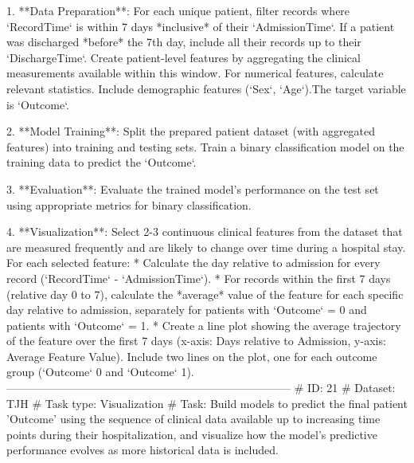 \begin{tcolorbox}[colback=cadmiumgreen!5!white,colframe=forestgreen!75!white,breakable,title=\textit{Generated analytical tasks in task 4.}]
\begin{VerbatimWrap}
 1. **Data Preparation**: For each unique patient, filter records where `RecordTime` is within 7 days *inclusive* of their `AdmissionTime`. If a patient was discharged *before* the 7th day, include all their records up to their `DischargeTime`. Create patient-level features by aggregating the clinical measurements available within this window. For numerical features, calculate relevant statistics. Include demographic features (`Sex`, `Age`).The target variable is `Outcome`.
 
 2. **Model Training**: Split the prepared patient dataset (with aggregated features) into training and testing sets. Train a binary classification model on the training data to predict the `Outcome`.
 
 3. **Evaluation**: Evaluate the trained model's performance on the test set using appropriate metrics for binary classification.
 
 4. **Visualization**: Select 2-3 continuous clinical features from the dataset that are measured frequently and are likely to change over time during a hospital stay. For each selected feature:
  * Calculate the day relative to admission for every record (`RecordTime` - `AdmissionTime`).
  * For records within the first 7 days (relative day 0 to 7), calculate the *average* value of the feature for each specific day relative to admission, separately for patients with `Outcome` = 0 and patients with `Outcome` = 1.
  * Create a line plot showing the average trajectory of the feature over the first 7 days (x-axis: Days relative to Admission, y-axis: Average Feature Value). Include two lines on the plot, one for each outcome group (`Outcome` 0 and `Outcome` 1).
-----------------------------------------------------------------------------
# ID: 21  
# Dataset: TJH 
# Task type: Visualization
# Task: Build models to predict the final patient 'Outcome' using the sequence of clinical data available up to increasing time points during their hospitalization, and visualize how the model's predictive performance evolves as more historical data is included.
 

\end{VerbatimWrap}
\end{tcolorbox}
